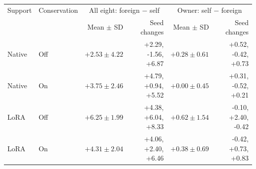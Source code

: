 \begin{tabular}{@{}llrrrr@{}}
\toprule
Support & Conservation & \multicolumn{2}{c}{All eight: foreign $-$ self} & \multicolumn{2}{c}{Owner: self $-$ foreign}\\
 & & Mean $\pm$ SD & Seed changes & Mean $\pm$ SD & Seed changes\\
\midrule
Native & Off & $+2.53 \pm 4.22$ & +2.29, -1.56, +6.87 & $+0.28 \pm 0.61$ & +0.52, -0.42, +0.73\\
Native & On & $+3.75 \pm 2.46$ & +4.79, +0.94, +5.52 & $+0.00 \pm 0.45$ & +0.31, -0.52, +0.21\\
LoRA & Off & $+6.25 \pm 1.99$ & +4.38, +6.04, +8.33 & $+0.62 \pm 1.54$ & -0.10, +2.40, -0.42\\
LoRA & On & $+4.31 \pm 2.04$ & +4.06, +2.40, +6.46 & $+0.38 \pm 0.69$ & -0.42, +0.73, +0.83\\
\bottomrule
\end{tabular}
